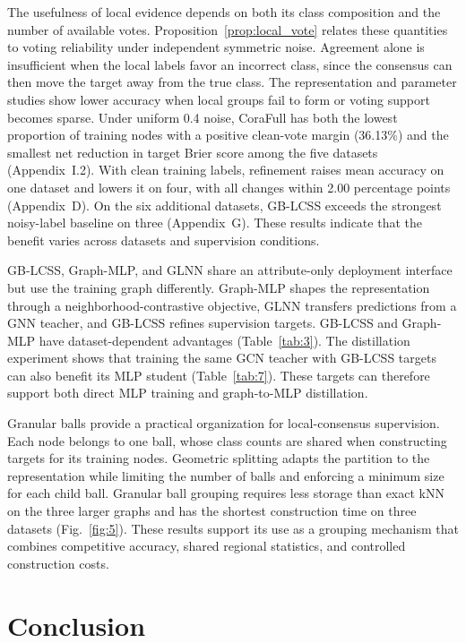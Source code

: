 \documentclass[10pt,letterpaper,nopreprintline]{elsarticle}
\theoremstyle{definition}
\theoremstyle{plain}
\begin{document}
The usefulness of local evidence depends on both its class composition and the number of available votes. Proposition~\ref{prop:local_vote} relates these quantities to voting reliability under independent symmetric noise. Agreement alone is insufficient when the local labels favor an incorrect class, since the consensus can then move the target away from the true class. The representation and parameter studies show lower accuracy when local groups fail to form or voting support becomes sparse. Under uniform 0.4 noise, CoraFull has both the lowest proportion of training nodes with a positive clean-vote margin (36.13\%) and the smallest net reduction in target Brier score among the five datasets (Appendix~I.2). With clean training labels, refinement raises mean accuracy on one dataset and lowers it on four, with all changes within 2.00 percentage points (Appendix~D). On the six additional datasets, GB-LCSS exceeds the strongest noisy-label baseline on three (Appendix~G). These results indicate that the benefit varies across datasets and supervision conditions.

GB-LCSS, Graph-MLP, and GLNN share an attribute-only deployment interface but use the training graph differently. Graph-MLP shapes the representation through a neighborhood-contrastive objective, GLNN transfers predictions from a GNN teacher, and GB-LCSS refines supervision targets. GB-LCSS and Graph-MLP have dataset-dependent advantages (Table~\ref{tab:3}). The distillation experiment shows that training the same GCN teacher with GB-LCSS targets can also benefit its MLP student (Table~\ref{tab:7}). These targets can therefore support both direct MLP training and graph-to-MLP distillation.

Granular balls provide a practical organization for local-consensus supervision. Each node belongs to one ball, whose class counts are shared when constructing targets for its training nodes. Geometric splitting adapts the partition to the representation while limiting the number of balls and enforcing a minimum size for each child ball. Granular ball grouping requires less storage than exact kNN on the three larger graphs and has the shortest construction time on three datasets (Fig.~\ref{fig:5}). These results support its use as a grouping mechanism that combines competitive accuracy, shared regional statistics, and controlled construction costs.

\section{Conclusion}\label{sec:5}
\end{document}
